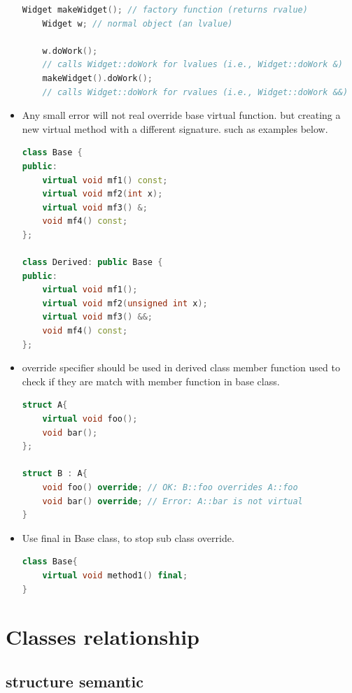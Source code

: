 \documentclass[a4paper,11pt,twoside]{book}
\begin{document}
\begin{itemize}
\begin{lstlisting}[frame=single, language=c++]
	Widget makeWidget(); // factory function (returns rvalue)
	Widget w; // normal object (an lvalue)
	
	w.doWork();
	// calls Widget::doWork for lvalues (i.e., Widget::doWork &)
	makeWidget().doWork();
	// calls Widget::doWork for rvalues (i.e., Widget::doWork &&)
\end{lstlisting}
	
\item Any small error will not real override base virtual function. but creating a new virtual method with a different signature. such as examples below.
\begin{lstlisting}[frame=single, language=c++]
class Base {
public:
	virtual void mf1() const;
	virtual void mf2(int x);
	virtual void mf3() &;
	void mf4() const;
};

class Derived: public Base {
public:
	virtual void mf1();
	virtual void mf2(unsigned int x);
	virtual void mf3() &&;
	void mf4() const;
};
\end{lstlisting}
	
	\item override specifier should be used in derived class member function used to check if they are match with member function in base class.
\begin{lstlisting}[frame=single, language=c++]
struct A{
	virtual void foo();
	void bar();
};
	
struct B : A{
	void foo() override; // OK: B::foo overrides A::foo
	void bar() override; // Error: A::bar is not virtual
}
	\end{lstlisting}
	
\item Use final in Base class, to stop sub class override.
\begin{lstlisting}[frame=single, language=c++, mathescape=true]
class Base{
	virtual void method1() final;
}
\end{lstlisting}
	
\end{itemize}



\section{Classes relationship}

\subsection{structure semantic}
\end{document}
